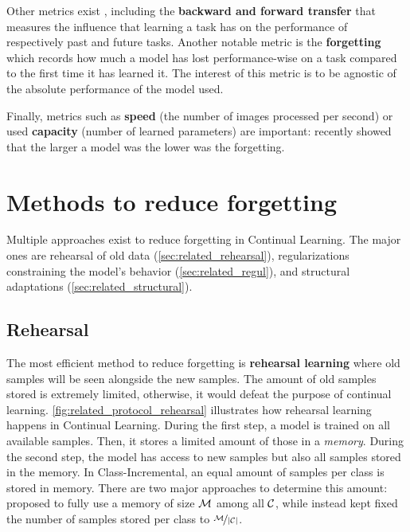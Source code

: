 Other metrics exist \citep{diaz2018continualmetrics}, including the \textbf{backward and
      forward transfer} \citep{lopezpaz2017gem} that measures the influence that learning a task has on
the performance of respectively past and future tasks. Another notable metric is the
\textbf{forgetting} \citep{chaudhry2018riemannien_walk} which records how much a model has lost
performance-wise on a task compared to the first time it has learned it. The interest of this metric
is to be agnostic of the absolute performance of the model used.

Finally, metrics such as \textbf{speed} (\ie the number of images processed per second) or used
\textbf{capacity} (\ie number of learned parameters) are important:
\cite{ramasesh2022scalecontinual} recently showed that the larger a model was the lower was the
forgetting.

\section{Methods to reduce forgetting}
\label{sec:related_methods}

Multiple approaches exist to reduce forgetting in Continual Learning. The major ones are
rehearsal of old data (\autoref{sec:related_rehearsal}), regularizations constraining the model's
behavior (\autoref{sec:related_regul}), and structural adaptations (\autoref{sec:related_structural}).

\subsection{Rehearsal}
\label{sec:related_rehearsal}

The most efficient method to reduce forgetting is \textbf{rehearsal learning} where old samples will
be seen alongside the new samples. The amount of old samples stored is extremely limited, otherwise,
it would defeat the purpose of continual learning. \autoref{fig:related_protocol_rehearsal} illustrates how
rehearsal learning happens in Continual Learning. During the first step, a model is trained on all
available samples. Then, it stores a limited amount of those in a \textit{memory}. During the second
step, the model has access to new samples but also all samples stored in the memory. In
Class-Incremental, an equal amount of samples per class is stored in memory. There are
two major approaches to determine this amount: \cite{rebuffi2017icarl} proposed to fully use a
memory of size $\mathcal{M}$ among all $\mathcal{C}$, while \cite{hou2019ucir} instead kept fixed the number of
samples stored per class to $\nicefrac{\mathcal{M}}{|\mathcal{C}|}$.

